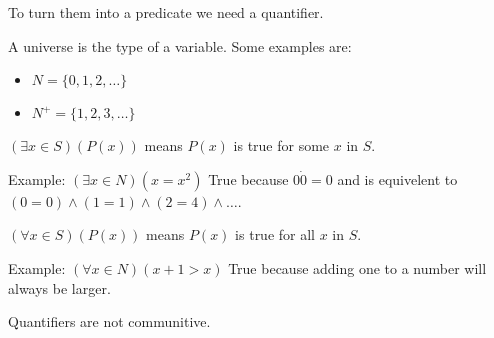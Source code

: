 To turn them into a predicate we need a quantifier.

\begin{definition}[Universe]
  A universe is the type of a variable. Some examples are:
  \begin{itemize}
    \item $N = \{0, 1, 2, \ldots\}$
    \item $N^+ = \{1, 2, 3, \ldots\}$
  \end{itemize}
\end{definition}

\begin{definition}
  $(\exists x \in S)(P(x))$ means $P(x)$ is true for some $x$ in $S$.

  Example: $(\exists x \in N) (x = x^2)$
  True because $0\dot 0 = 0$ and is equivelent to $(0=0) \land (1=1) \land(2=4)\land\ldots$.
\end{definition}

\begin{definition}
  $(\forall x \in S)(P(x))$ means $P(x)$ is true for all $x$ in $S$.

  Example: $(\forall x \in N) (x+1>x)$
  True because adding one to a number will always be larger.
\end{definition}

\begin{note}
  Quantifiers are not communitive.
\end{note}
